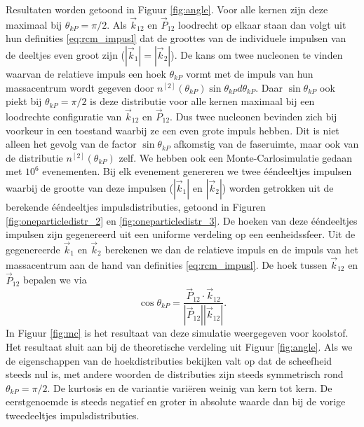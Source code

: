 \documentclass[11pt,twoside]{book}
\begin{document}
Resultaten worden getoond in Figuur \ref{fig:angle}. Voor alle kernen zijn deze maximaal bij $\theta_{kP} = \pi/2$. Als $\vec{k}_{12}$ en $\vec{P}_{12}$ loodrecht op elkaar staan dan volgt uit hun  definities \eqref{eq:rcm_impusl} dat de groottes van de individuele impulsen van de deeltjes even groot zijn ($|\vec{k}_1| = |\vec{k}_2|$). De kans om twee nucleonen te vinden waarvan de relatieve impuls een hoek $\theta_{kP}$ vormt met de impuls van hun massacentrum wordt gegeven door $n^{[2]}(\theta_{kP})\sin{\theta_{kP}}d\theta_{kP}$. Daar $\sin{\theta_{kP}}$ ook piekt bij $\theta_{kP} = \pi/2$ is deze distributie voor alle kernen maximaal bij een loodrechte configuratie van $\vec{k}_{12}$ en $\vec{P}_{12}$. Dus twee nucleonen bevinden zich bij voorkeur in een toestand waarbij ze een even grote impuls hebben. Dit is niet alleen het gevolg van de factor $\sin{\theta_{kP}}$ afkomstig van de faseruimte, maar ook van de distributie $n^{[2]}(\theta_{kP})$ zelf.  We hebben ook een Monte-Carlosimulatie gedaan met $10^6$ evenementen. Bij elk evenement genereren we twee \'{e}\'{e}ndeeltjes impulsen waarbij de grootte van deze impulsen ($|\vec{k}_1|$ en $|\vec{k}_2|$) worden getrokken uit de berekende \'{e}\'{e}ndeeltjes impulsdistributies, getoond in Figuren \ref{fig:oneparticledistr_2} en \ref{fig:oneparticledistr_3}. De hoeken van deze \'{e}\'{e}ndeeltjes impulsen zijn gegenereerd uit een uniforme verdeling op een eenheidssfeer. Uit de gegenereerde $\vec{k}_1$ en $\vec{k}_2$ berekenen we dan de relatieve impuls en de impuls van het massacentrum aan de hand van definities \eqref{eq:rcm_impusl}. De hoek tussen $\vec{k}_{12}$ en $\vec{P}_{12}$ bepalen we via
\begin{equation} \label{eq:thetakp}
\cos{\theta_{kP}} = \frac{\vec{P}_{12} \cdot \vec{k}_{12}}{|\vec{P}_{12}| |\vec{k}_{12}|}.
\end{equation}
In Figuur \ref{fig:mc} is het resultaat van deze simulatie weergegeven voor koolstof. Het resultaat sluit aan bij de theoretische verdeling uit Figuur \ref{fig:angle}.
Als we de eigenschappen van de hoekdistributies bekijken valt op dat de scheefheid steeds nul is, met andere woorden de distributies zijn steeds symmetrisch rond $\theta_{kP} = \pi/2$. De kurtosis en  de variantie vari\"{e}ren weinig van kern tot kern. De eerstgenoemde is steeds negatief en groter in absolute waarde dan bij de vorige tweedeeltjes impulsdistributies.
\end{document}
